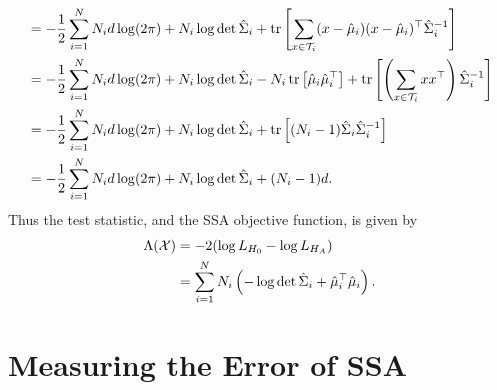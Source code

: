 \documentclass{article}
\newcommand{\1}{\ensuremath{\mathds{1}}}
\newcommand{\0}{\ensuremath{0}}
\DeclareMathOperator*{\trace}{tr}
\begin{document}
\begin{appendices}
\begin{align*}
& = -\frac{1}{2} \sum_{i=1}^N N_i d \log (2\pi)  + N_i \log \det \esi_i + 
		\trace\left[ \sum_{x \in \mathcal{T}_i} (x-\emu_i) (x-\emu_i)^\top \esi_i^{-1} \right] \\
& = -\frac{1}{2} \sum_{i=1}^N N_i d \log (2\pi) + N_i \log \det \esi_i - N_i \trace \left[ \emu_i \emu^\top_i \right]
		+ \trace\left[ \left(\sum_{x \in \mathcal{T}_i} x x^\top\right)  \esi_i^{-1}  \right] \\
& = -\frac{1}{2} \sum_{i=1}^N N_i d \log (2\pi) + N_i \log \det \esi_i + \trace\left[  (N_i-1) \esi_i \esi_i^{-1} \right] \\
& = -\frac{1}{2} \sum_{i=1}^N N_i d \log (2\pi) + N_i \log \det \esi_i + (N_i-1) d .
\end{align*}
Thus the test statistic, and the SSA objective function, is given by 
\begin{align*}
 \Lambda(\mathcal{X}) & = -2 ( \log L_{H_0} - \log L_{H_A} ) \\
 						& = \sum_{i=1}^N N_i \left(-\log \det\hat{\Sigma}_i + \hat{\mu}_i^\top \hat{\mu}_i \right) . 
\end{align*}

\section{Measuring the Error of SSA}
\label{app:error_measure}


\end{appendices}
\end{document}
